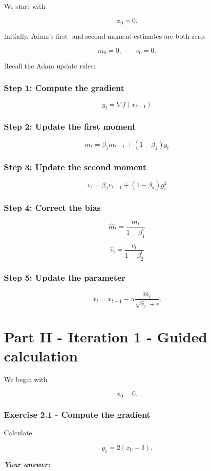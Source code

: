 \documentclass{course_sheet}
\begin{document}
We start with

\[
x_0 = 0.
\]

Initially, Adam's first- and second-moment estimates are both zero:

\[
m_0 = 0,
\qquad
v_0 = 0.
\]

Recall the Adam update rules:

\subsubsection*{Step 1: Compute the gradient}
\[
g_t = \nabla f(x_{t-1})
\]

\subsubsection*{Step 2: Update the first moment}
\[
m_t = \beta_1m_{t-1} + (1-\beta_1)g_t
\]

\subsubsection*{Step 3: Update the second moment}
\[
v_t = \beta_2v_{t-1} + (1-\beta_2)g_t^2
\]

\subsubsection*{Step 4: Correct the bias}
\[
\hat m_t = \frac{m_t}{1-\beta_1^t}
\]

\[
\hat v_t = \frac{v_t}{1-\beta_2^t}
\]

\subsubsection*{Step 5: Update the parameter}
\[
x_t =
x_{t-1}
-
\alpha
\frac{\hat m_t}
{\sqrt{\hat v_t}+\epsilon}.
\]

\clearpage
\section*{Part II - Iteration 1 - Guided calculation}
We begin with

\[
x_0=0.
\]

\subsubsection*{Exercise 2.1 - Compute the gradient}
Calculate

\[
g_1 = 2(x_0-3).
\]

\textbf{\textit{Your answer:}}
\end{document}
